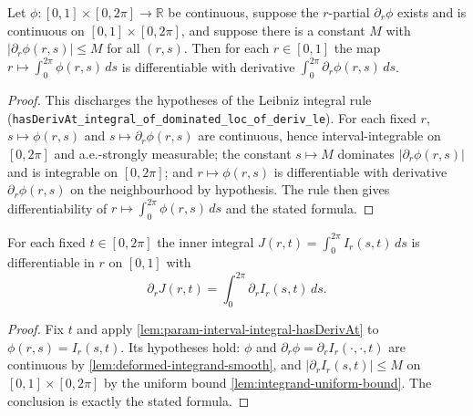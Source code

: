 \begin{lemma}
    \label{lem:param-interval-integral-hasDerivAt}
    Let $\phi:[0,1]\times[0,2\pi]\to\mathbb{R}$ be continuous, suppose the
    $r$-partial $\partial_r\phi$ exists and is continuous on $[0,1]\times[0,2\pi]$,
    and suppose there is a constant $M$ with $\lvert\partial_r\phi(r,s)\rvert\le M$
    for all $(r,s)$. Then for each $r\in[0,1]$ the map
    $r\mapsto\int_0^{2\pi}\phi(r,s)\,ds$ is differentiable with derivative
    $\int_0^{2\pi}\partial_r\phi(r,s)\,ds$.
\end{lemma}
\begin{proof}
    This discharges the hypotheses of the Leibniz integral rule
    (\texttt{hasDerivAt\_integral\_of\_dominated\_loc\_of\_deriv\_le}). For each
    fixed $r$, $s\mapsto\phi(r,s)$ and $s\mapsto\partial_r\phi(r,s)$ are continuous,
    hence interval-integrable on $[0,2\pi]$ and a.e.-strongly measurable; the
    constant $s\mapsto M$ dominates $\lvert\partial_r\phi(r,s)\rvert$ and is
    integrable on $[0,2\pi]$; and $r\mapsto\phi(r,s)$ is differentiable with
    derivative $\partial_r\phi(r,s)$ on the neighbourhood by hypothesis. The rule
    then gives differentiability of $r\mapsto\int_0^{2\pi}\phi(r,s)\,ds$ and the
    stated formula.
\end{proof}

\begin{lemma}
    \label{lem:inner-integral-hasDerivAt}
    For each fixed $t\in[0,2\pi]$ the inner integral
    $J(r,t)=\int_0^{2\pi} I_r(s,t)\,ds$ is differentiable in $r$ on $[0,1]$ with
    \[
        \partial_r J(r,t)=\int_0^{2\pi}\partial_r I_r(s,t)\,ds .
    \]
\end{lemma}
\begin{proof}
    Fix $t$ and apply \cref{lem:param-interval-integral-hasDerivAt} to
    $\phi(r,s)=I_r(s,t)$. Its hypotheses hold: $\phi$ and $\partial_r\phi=\partial_r
    I_r(\cdot,\cdot,t)$ are continuous by \cref{lem:deformed-integrand-smooth}, and
    $\lvert\partial_r I_r(s,t)\rvert\le M$ on $[0,1]\times[0,2\pi]$ by the uniform
    bound \cref{lem:integrand-uniform-bound}. The conclusion is exactly the stated
    formula.
\end{proof}

